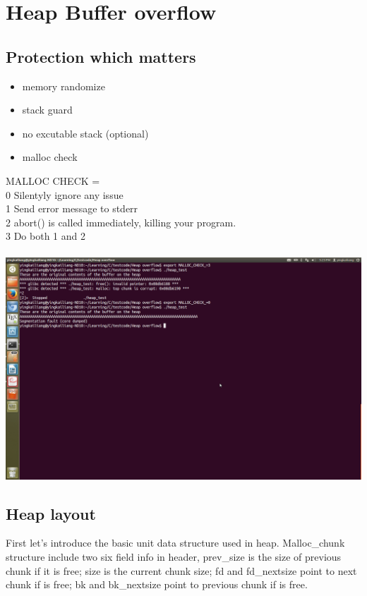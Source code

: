\documentclass[12pt]{article}
\begin{document}
\section{Heap Buffer overflow}

\subsection{Protection which matters}
\begin{itemize}
\item memory randomize 
\item stack guard
\item no excutable stack (optional)
\item malloc check
\end{itemize}
MALLOC CHECK = \\
0 Silentyly ignore any issue \\
1 Send error message to stderr \\
2 abort() is called immediately, killing your program. \\
3 Do both 1 and 2\\\\ 
\includegraphics[scale=0.2]{Malloc_check.png} \\

\subsection{Heap layout}

First let's introduce the basic unit data structure used in heap. Malloc\_chunk structure include two six field info in header, prev\_size is the size of previous chunk if it is free; size is the current chunk size; fd and fd\_nextsize point to next chunk if is free; bk and bk\_nextsize point to previous chunk if is free.   
\end{document}
